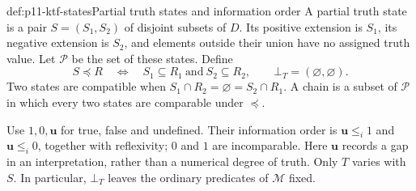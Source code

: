 \begin{hbdefinition}{def:p11-ktf-states}{Partial truth states and information order}
A partial truth state is a pair \(S=(S_1,S_2)\) of disjoint subsets of
\(D\). Its positive extension is \(S_1\), its negative extension is
\(S_2\), and elements outside their union have no assigned truth value.
Let \(\mathcal P\) be the set of these states. Define
\[
 S\preceq R\quad\Longleftrightarrow\quad
 S_1\subseteq R_1\ \text{and}\ S_2\subseteq R_2,
 \qquad \bot_T=(\varnothing,\varnothing).
\]
Two states are compatible when
\(S_1\cap R_2=\varnothing=S_2\cap R_1\).
A chain is a subset of \(\mathcal P\) in which every two states are
comparable under \(\preceq\).

Use \(1,0,\mathbf u\) for true, false and undefined. Their information
order is \(\mathbf u\leq_i1\) and \(\mathbf u\leq_i0\), together
with reflexivity; \(0\) and \(1\) are incomparable. Here
\(\mathbf u\) records a gap in an interpretation, rather than a numerical
degree of truth. Only \(T\) varies with \(S\). In particular,
\(\bot_T\) leaves the ordinary predicates of \(\mathcal M\) fixed.
\end{hbdefinition}

